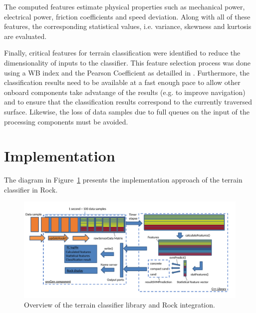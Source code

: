\documentclass{article}
\begin{document}

The computed features estimate physical properties such as mechanical power, electrical power, friction coefficients and speed deviation. Along with all of these features, the corresponding statistical values, i.e. variance, skewness and kurtosis are evaluated. 

Finally, critical features for terrain classification were identified to reduce the dimensionality of inputs to the classifier.
This feature selection process was done using a WB index and the Pearson Coefficient as detailled in \cite{Dimastrogiovanni2020}. 
Furthermore, the classification results need to be available at a fast enough pace to allow other onboard components take advatange of the results (e.g. to improve navigation) and to ensure that the classification results correspond to the currently traversed surface. 
Likewise, the loss of data samples due to full queues on the input of the processing components must be avoided. 

\section{Implementation}

The diagram in Figure~\ref{fig:overview} presents the implementation approach of the terrain classifier in Rock.

\begin{figure}[h]
\centering
\includegraphics[width=\textwidth]{../figures/OverviewTC2.pdf}
\caption{\label{fig:overview}Overview of the terrain classifier library and Rock integration.}
\end{figure}

\end{document}
